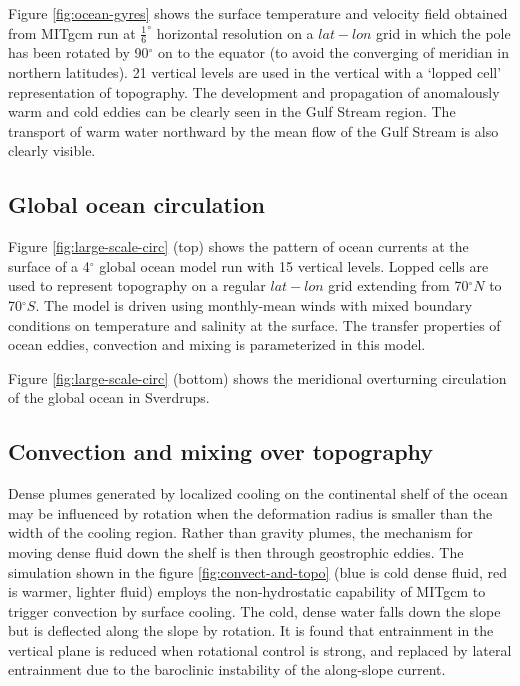 Figure \ref{fig:ocean-gyres} shows the surface temperature and velocity 
field obtained from MITgcm run at $\frac{1}{6}^{\circ }$ horizontal 
resolution on a $lat-lon$
grid in which the pole has been rotated by 90$^{\circ }$ on to the equator
(to avoid the converging of meridian in northern latitudes). 21 vertical
levels are used in the vertical with a `lopped cell' representation of
topography. The development and propagation of anomalously warm and cold
eddies can be clearly seen in the Gulf Stream region. The transport of
warm water northward by the mean flow of the Gulf Stream is also clearly
visible.




\subsection{Global ocean circulation}

Figure \ref{fig:large-scale-circ} (top) shows the pattern of ocean currents at 
the surface of a 4$^{\circ }$
global ocean model run with 15 vertical levels. Lopped cells are used to
represent topography on a regular $lat-lon$ grid extending from 70$^{\circ
}N $ to 70$^{\circ }S$. The model is driven using monthly-mean winds with
mixed boundary conditions on temperature and salinity at the surface. The
transfer properties of ocean eddies, convection and mixing is parameterized
in this model.

Figure \ref{fig:large-scale-circ} (bottom) shows the meridional overturning 
circulation of the global ocean in Sverdrups.



\subsection{Convection and mixing over topography}

Dense plumes generated by localized cooling on the continental shelf of the
ocean may be influenced by rotation when the deformation radius is smaller
than the width of the cooling region. Rather than gravity plumes, the
mechanism for moving dense fluid down the shelf is then through geostrophic
eddies. The simulation shown in the figure \ref{fig:convect-and-topo}
(blue is cold dense fluid, red is
warmer, lighter fluid) employs the non-hydrostatic capability of MITgcm to
trigger convection by surface cooling. The cold, dense water falls down the
slope but is deflected along the slope by rotation. It is found that
entrainment in the vertical plane is reduced when rotational control is
strong, and replaced by lateral entrainment due to the baroclinic
instability of the along-slope current.

